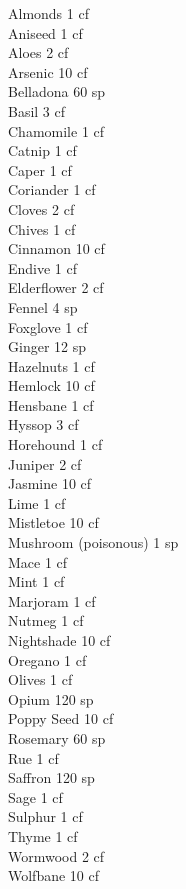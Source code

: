 \begin{multicols}{3}
{Almonds				\hfill 1 cf \\
Aniseed				\hfill 1 cf \\
Aloes				\hfill 2 cf \\
Arsenic				\hfill 10 cf \\
Belladona			\hfill 60 sp \\
Basil				\hfill 3 cf \\
Chamomile			\hfill 1 cf \\
Catnip				\hfill 1 cf \\
Caper				\hfill 1 cf \\
Coriander			\hfill 1 cf \\
Cloves				\hfill 2 cf \\
Chives				\hfill 1 cf \\
Cinnamon			\hfill 10 cf \\
Endive				\hfill 1 cf \\
Elderflower			\hfill 2 cf \\
Fennel				\hfill 4 sp \\
Foxglove			\hfill 1 cf \\
Ginger				\hfill 12 sp \\
Hazelnuts			\hfill 1 cf \\
Hemlock				\hfill 10 cf \\
Hensbane			\hfill 1 cf \\
Hyssop				\hfill 3 cf \\
Horehound			\hfill 1 cf \\
Juniper				\hfill 2 cf \\
Jasmine				\hfill 10 cf \\
Lime				\hfill 1 cf \\
Mistletoe			\hfill 10 cf \\
Mushroom (poisonous)		\hfill 1 sp \\
Mace				\hfill 1 cf \\
Mint				\hfill 1 cf \\
Marjoram			\hfill 1 cf \\
Nutmeg				\hfill 1 cf \\
Nightshade			\hfill 10 cf \\
Oregano				\hfill 1 cf \\
Olives				\hfill 1 cf \\
Opium				\hfill 120 sp \\
Poppy Seed			\hfill 10 cf \\
Rosemary			\hfill 60 sp \\
Rue				\hfill 1 cf \\
Saffron				\hfill 120 sp \\
Sage				\hfill 1 cf \\
Sulphur				\hfill 1 cf \\
Thyme				\hfill 1 cf \\
Wormwood			\hfill 2 cf \\
Wolfbane			\hfill 10 cf \\

}
\end{multicols}
